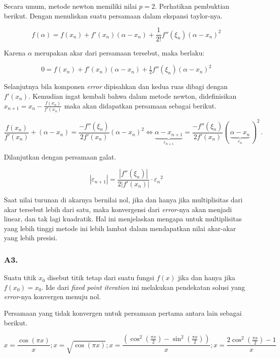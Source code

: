 \documentclass[11pt, a4paper, onecolumn, oneside, final]{report}
\begin{document}
Secara umum, metode newton memiliki nilai $p = 2$. Perhatikan pembuktian berikut. Dengan menuliskan suatu persamaan dalam ekspansi taylor-nya.

$$
f(\alpha )=f(x_{n})+f'(x_{n})(\alpha -x_{n})+{\frac {1}{2!}}f''(\xi _{n})(\alpha -x_{n})^{2}
$$

Karena $\alpha$ merupakan akar dari persamaan tersebut, maka berlaku:

$$
0=f(x_{n})+f'(x_{n})(\alpha -x_{n})+{\tfrac {1}{2}}f''(\xi _{n})(\alpha -x_{n})^{2}
$$

Selanjutnya bila komponen \textit{error} dipisahkan dan kedua ruas dibagi dengan $f'(x_n)$. Kemudian ingat kembali bahwa dalam metode newton, didefinisikan $x_{n+1} = x_n - \frac{f(x_n)}{f'(x_n)}$ maka akan didapatkan persamaan sebagai berikut.

$$
{\frac {f(x_{n})}{f'(x_{n})}+\left(\alpha -x_{n}\right)={\frac {-f''(\xi _{n})}{2f'(x_{n})}}\left(\alpha -x_{n}\right)^{2}
\iff
 \underbrace {\alpha -x_{n+1}} _{\varepsilon _{n+1}}={\frac {-f''(\xi _{n})}{2f'(x_{n})}}(\,\underbrace {\alpha -x_{n}} _{\varepsilon _{n}}\,)^{2}\,.}
$$

Dilanjutkan dengan persamaan galat.

$$
\left|{\varepsilon _{n+1}}\right|={\frac {\left|f''(\xi _{n})\right|}{2\left|f'(x_{n})\right|}}\cdot {\varepsilon _{n}}^{2}
$$

Saat nilai turunan di akarnya bernilai nol, jika dan hanya jika multiplisitas dari akar tersebut lebih dari satu, maka konvergensi dari \textit{error}-nya akan menjadi linear, dan tak lagi kuadratik. Hal ini menjelaskan mengapa untuk multiplisitas yang lebih tinggi metode ini lebih lambat dalam mendapatkan nilai akar-akar yang lebih presisi.

\subsubsection*{A3.}

Suatu titik $x_0$ disebut titik tetap dari suatu fungsi $f(x)$ jika dan hanya jika $f(x_0) = x_0$. Ide dari \textit{fixed point iteration} ini melakukan pendekatan solusi yang \textit{error}-nya konvergen menuju nol.

Persamaan yang tidak konvergen untuk persamaan pertama antara lain sebagai berikut.

$$
x = \frac{\cos(\pi x)}{x}; x = \sqrt{\cos(\pi x)}; x = \frac{(\cos^2(\frac{\pi x}{2}) - \sin^2(\frac{\pi x}{2}))}{x}; x = \frac{2 \cos^2(\frac{\pi x}{2}) - 1}{x}
$$
\end{document}
